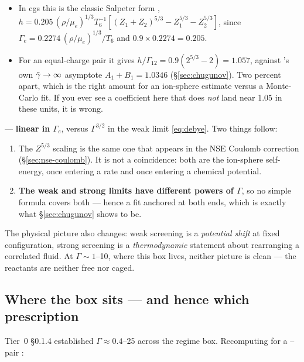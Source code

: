 \begin{itemize}
\item In cgs this is the classic Salpeter form \citep[eq.~29]{salpeter1954},
      $h = 0.205\,(\rho/\mu_e)^{1/3}T_6^{-1}
      [(Z_1+Z_2)^{5/3} - Z_1^{5/3} - Z_2^{5/3}]$, since
      $\Gamma_e = 0.2274\,(\rho/\mu_e)^{1/3}/T_6$ and
      $0.9 \times 0.2274 = 0.205$.
\item For an equal-charge pair it gives
      $h/\Gamma_{12} = 0.9(2^{5/3} - 2) = \mathbf{1.057}$, against
      's own $\tilde\gamma \to \infty$ asymptote
      $A_1 + B_1 = \mathbf{1.0346}$ (\S\ref{sec:chugunov}). Two percent apart,
      which is the right amount for an ion-sphere estimate versus a Monte-Carlo
      fit. If you ever see a coefficient here that does \emph{not} land near
      1.05 in these units, it is wrong.
\end{itemize}

--- \textbf{linear in $\Gamma_e$}, versus $\Gamma^{3/2}$ in the weak limit
\eqref{eq:debye}. Two things follow:

\begin{enumerate}
\item The $Z^{5/3}$ scaling is the same one that appears in the NSE Coulomb
      correction (\S\ref{sec:nse-coulomb}). It is not a coincidence: both are the
      ion-sphere self-energy, once entering a rate and once entering a chemical
      potential.
\item \textbf{The weak and strong limits have different powers of $\Gamma$}, so
      no simple formula covers both --- hence a fit anchored at both ends, which
      is exactly what \S\ref{sec:chugunov} shows  to be.
\end{enumerate}

The physical picture also changes: weak screening is a \emph{potential shift} at
fixed configuration, strong screening is a \emph{thermodynamic} statement about
rearranging a correlated fluid. At $\Gamma \sim 1$--10, where this box lives,
neither picture is clean --- the reactants are neither free nor caged.

\subsection{Where the box sits --- and hence which prescription}
\label{sec:boxgamma}

Tier~0 \S0.1.4 established $\Gamma \approx 0.4$--25 across the regime box.
Recomputing for a -- pair \derivedhere{}:

